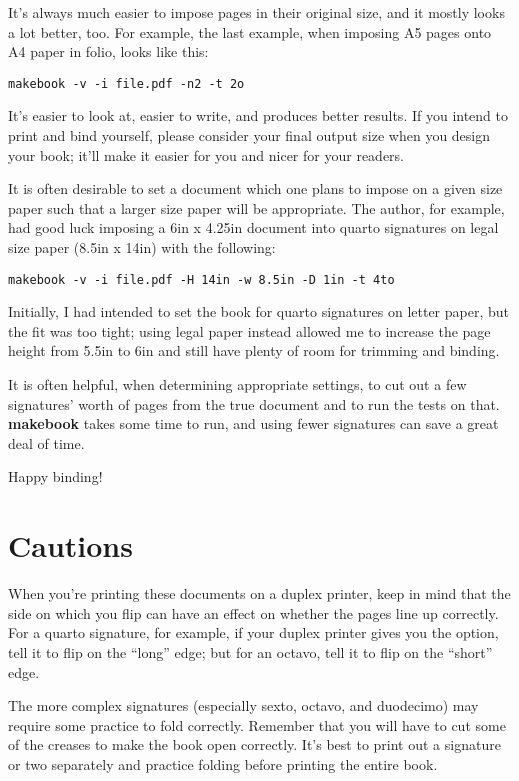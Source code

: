 \documentclass[12pt,twoside,final]{extarticle}
\begin{document}
It's always much easier to impose pages in their original size, and it mostly looks  a lot better, too. For example, the last example, when imposing A5 pages onto A4 paper in folio, looks like this:

{\scriptsize
\begin{verbatim}
makebook -v -i file.pdf -n2 -t 2o
\end{verbatim}
}
%
It's easier to look at, easier to write, and produces better results. If you intend to print and bind yourself, please consider your final output size when you design your book; it'll make it easier for you and nicer for your readers.

It is often desirable to set a document which one plans to impose on a given size paper such that a larger size paper will be appropriate. The author, for example, had good luck imposing a 6in x 4.25in document into quarto signatures on legal size paper (8.5in x 14in) with the following:

{\scriptsize
\begin{verbatim}
makebook -v -i file.pdf -H 14in -w 8.5in -D 1in -t 4to
\end{verbatim}
}
%
Initially, I had intended to set the book for quarto signatures on letter paper, but the fit was too tight; using legal paper instead allowed me to increase the page height from 5.5in to 6in and still have plenty of room for trimming and binding.

It is often helpful, when determining appropriate settings, to cut out a few signatures' worth of pages from the true document and to run the tests on that.  \textbf{makebook} takes some time to run, and using fewer signatures can save a great deal of time.

Happy binding!
\section{Cautions}
When you're printing these documents on a duplex printer, keep in mind that the side on which you flip can have an effect on whether the pages line up correctly. For a quarto signature, for example, if your duplex  printer gives you the  option, tell  it to flip on the ``long'' edge; but for an octavo, tell it to flip on the ``short'' edge.

The more complex signatures (especially sexto, octavo, and duodecimo) may require some practice to fold  correctly. Remember that you will have to cut some of the creases to make the book open correctly. It's best to print out a signature or two separately and practice folding before printing the entire book.
\end{document}
